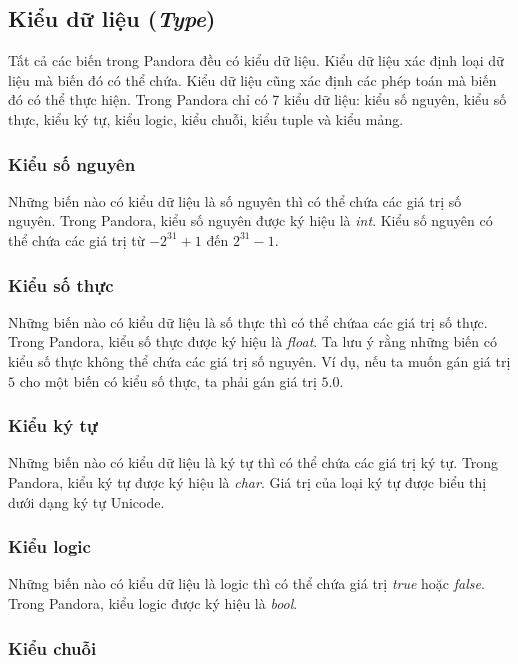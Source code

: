 \subsection{Kiểu dữ liệu (\textit{Type})}

    Tất cả các biến trong Pandora đều có kiểu dữ liệu. Kiểu dữ liệu xác định loại dữ liệu mà biến đó có thể chứa. Kiểu dữ liệu cũng xác định các phép toán mà biến đó có thể thực hiện. Trong Pandora chỉ có 7 kiểu dữ liệu: kiểu số nguyên, kiểu số thực, kiểu ký tự, kiểu logic, kiểu chuỗi, kiểu tuple và kiểu mảng.

\subsubsection{Kiểu số nguyên}

    Những biến nào có kiểu dữ liệu là số nguyên thì có thể chứa các giá trị số nguyên. Trong Pandora, kiểu số nguyên được ký hiệu là \textit{int}. Kiểu số nguyên có thể chứa các giá trị từ $-2^{31}+1$ đến $2^{31}-1$.

\subsubsection{Kiểu số thực}

    Những biến nào có kiểu dữ liệu là số thực thì có thể chứaa các giá trị số thực. Trong Pandora, kiểu số thực được ký hiệu là \textit{float}. Ta lưu ý rằng những biến có kiểu số thực không thể chứa các giá trị số nguyên. Ví dụ, nếu ta muốn gán giá trị $5$ cho một biến có kiểu số thực, ta phải gán giá trị $5.0$.

\subsubsection{Kiểu ký tự}

    Những biến nào có kiểu dữ liệu là ký tự thì có thể chứa các giá trị ký tự. Trong Pandora, kiểu ký tự được ký hiệu là \textit{char}. Giá trị của loại ký tự được biểu thị dưới dạng ký tự Unicode.

\subsubsection{Kiểu logic}

    Những biến nào có kiểu dữ liệu là logic thì có thể chứa giá trị \textit{true} hoặc \textit{false}. Trong Pandora, kiểu logic được ký hiệu là \textit{bool}.

\subsubsection{Kiểu chuỗi}

